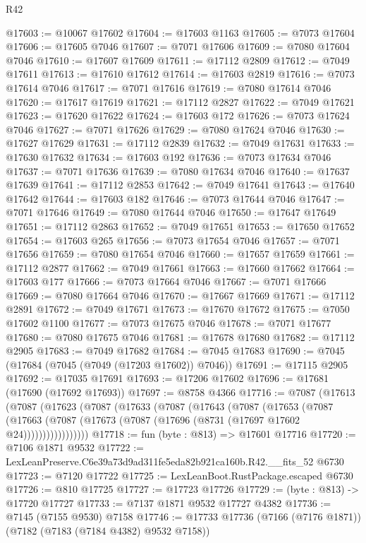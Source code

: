\begin{lexlean}{R42}
\begin{coremodule}
{@17603 := @10067 @17602
@17604 := @17603 @1163
@17605 := @7073 @17604
@17606 := @17605 @7046
@17607 := @7071 @17606
@17609 := @7080 @17604 @7046
@17610 := @17607 @17609
@17611 := @17112 @2809
@17612 := @7049 @17611
@17613 := @17610 @17612
@17614 := @17603 @2819
@17616 := @7073 @17614 @7046
@17617 := @7071 @17616
@17619 := @7080 @17614 @7046
@17620 := @17617 @17619
@17621 := @17112 @2827
@17622 := @7049 @17621
@17623 := @17620 @17622
@17624 := @17603 @172
@17626 := @7073 @17624 @7046
@17627 := @7071 @17626
@17629 := @7080 @17624 @7046
@17630 := @17627 @17629
@17631 := @17112 @2839
@17632 := @7049 @17631
@17633 := @17630 @17632
@17634 := @17603 @192
@17636 := @7073 @17634 @7046
@17637 := @7071 @17636
@17639 := @7080 @17634 @7046
@17640 := @17637 @17639
@17641 := @17112 @2853
@17642 := @7049 @17641
@17643 := @17640 @17642
@17644 := @17603 @182
@17646 := @7073 @17644 @7046
@17647 := @7071 @17646
@17649 := @7080 @17644 @7046
@17650 := @17647 @17649
@17651 := @17112 @2863
@17652 := @7049 @17651
@17653 := @17650 @17652
@17654 := @17603 @265
@17656 := @7073 @17654 @7046
@17657 := @7071 @17656
@17659 := @7080 @17654 @7046
@17660 := @17657 @17659
@17661 := @17112 @2877
@17662 := @7049 @17661
@17663 := @17660 @17662
@17664 := @17603 @177
@17666 := @7073 @17664 @7046
@17667 := @7071 @17666
@17669 := @7080 @17664 @7046
@17670 := @17667 @17669
@17671 := @17112 @2891
@17672 := @7049 @17671
@17673 := @17670 @17672
@17675 := @7050 @17602 @1100
@17677 := @7073 @17675 @7046
@17678 := @7071 @17677
@17680 := @7080 @17675 @7046
@17681 := @17678 @17680
@17682 := @17112 @2905
@17683 := @7049 @17682
@17684 := @7045 @17683
@17690 := @7045 (@17684 (@7045 (@7049 (@17203 @17602)) @7046))
@17691 := @17115 @2905
@17692 := @17035 @17691
@17693 := @17206 @17602
@17696 := @17681 (@17690 (@17692 @17693))
@17697 := @8758 @4366
@17716 := @7087
    (@17613
      (@7087
        (@17623
          (@7087
            (@17633
              (@7087
                (@17643
                  (@7087
                    (@17653
                      (@7087
                        (@17663
                          (@7087 (@17673 (@7087 (@17696 (@8731 (@17697 @17602 @24)))))))))))))))))
@17718 := fun (byte : @813) => @17601 @17716
@17720 := @7106 @1871 @9532
@17722 := LexLeanPreserve.C6e39a73d9ad311fe5eda82b921ca160b.R42.__fits_52 @6730
@17723 := @7120 @17722
@17725 := LexLeanBoot.RustPackage.escaped @6730
@17726 := @810 @17725
@17727 := @17723 @17726
@17729 := (byte : @813) -> @17720 @17727
@17733 := @7137 @1871 @9532 @17727 @4382
@17736 := @7145 (@7155 @9530) @7158
@17746 := @17733 @17736 (@7166 (@7176 @1871)) (@7182 (@7183 (@7184 @4382) @9532 @7158))
}
\end{coremodule}
\end{lexlean}
